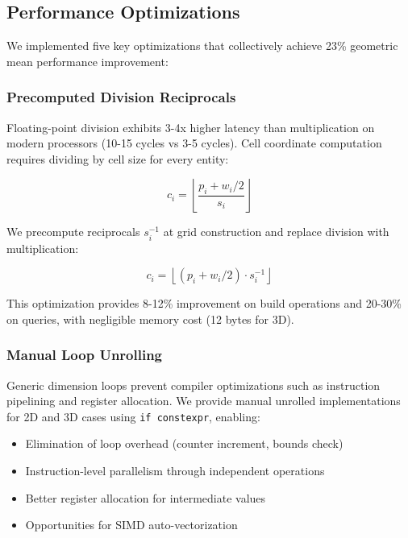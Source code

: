 \documentclass[11pt]{article}
\begin{document}
\subsection{Performance Optimizations}

We implemented five key optimizations that collectively achieve 23\% geometric mean performance improvement:

\subsubsection{Precomputed Division Reciprocals}

Floating-point division exhibits 3-4x higher latency than multiplication on modern processors (10-15 cycles vs 3-5 cycles). Cell coordinate computation requires dividing by cell size for every entity:

\begin{equation}
c_i = \left\lfloor \frac{p_i + w_i/2}{s_i} \right\rfloor
\end{equation}

We precompute reciprocals $s_i^{-1}$ at grid construction and replace division with multiplication:

\begin{equation}
c_i = \left\lfloor (p_i + w_i/2) \cdot s_i^{-1} \right\rfloor
\end{equation}

This optimization provides 8-12\% improvement on build operations and 20-30\% on queries, with negligible memory cost (12 bytes for 3D).

\subsubsection{Manual Loop Unrolling}

Generic dimension loops prevent compiler optimizations such as instruction pipelining and register allocation. We provide manual unrolled implementations for 2D and 3D cases using \texttt{if constexpr}, enabling:

\begin{itemize}
\item Elimination of loop overhead (counter increment, bounds check)
\item Instruction-level parallelism through independent operations
\item Better register allocation for intermediate values
\item Opportunities for SIMD auto-vectorization
\end{itemize}
\end{document}
